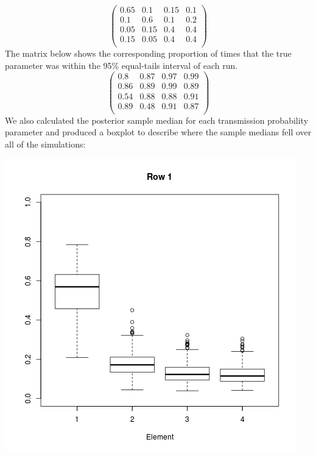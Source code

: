 \documentclass[11pt,a4paper]{report}
\begin{document}
\[ \begin{pmatrix}
	0.65 & 0.1 & 0.15 & 0.1 \\
	0.1 & 0.6 & 0.1 & 0.2 \\
	0.05 & 0.15 & 0.4 & 0.4 \\
	0.15 & 0.05 & 0.4 & 0.4 \\
\end{pmatrix} \]
The matrix below shows the corresponding proportion of times that the true parameter was within the 95\% equal-tails interval of each run.
\[\begin{pmatrix}
0.8 & 0.87 & 0.97 & 0.99 \\
0.86 & 0.89 & 0.99 & 0.89 \\
0.54 & 0.88 & 0.88 & 0.91 \\
0.89 & 0.48 & 0.91 & 0.87 \\
\end{pmatrix}\]
We also calculated the posterior sample median for each transmission probability parameter and produced a boxplot to describe where the sample medians fell over all of the simulations:
\begin{center}
\includegraphics[scale=0.6]{row1.png}
\end{center}
\end{document}
